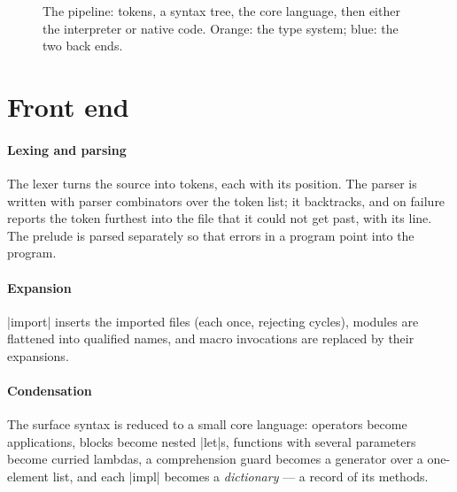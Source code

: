 \begin{figure}[ht]
\caption{The pipeline: tokens, a syntax tree, the core language, then
either the interpreter or native code. Orange: the type system; blue: the
two back ends.}
\label{fig:pipeline}
\end{figure}

\section{Front end}

\paragraph{Lexing and parsing} The lexer turns the source into tokens, each
with its position. The parser is written with parser combinators over the
token list; it backtracks, and on failure reports the token furthest into
the file that it could not get past, with its line. The prelude is parsed
separately so that errors in a program point into the program.

\paragraph{Expansion} \fc|import| inserts the imported files (each once,
rejecting cycles), modules are flattened into qualified names, and macro
invocations are replaced by their expansions.

\paragraph{Condensation} The surface syntax is reduced to a small core
language: operators become applications, blocks become nested \fc|let|s,
functions with several parameters become curried lambdas, a comprehension
guard becomes a generator over a one-element list, and each \fc|impl|
becomes a \emph{dictionary} --- a record of its methods.

